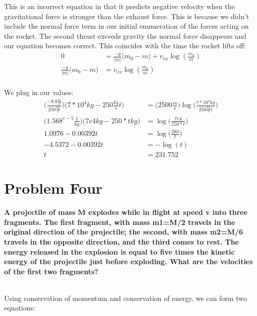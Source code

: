 \documentclass[10pt]{article} %
\begin{document}
This is an incorrect equation in that it predicts negative velocity when the gravitational force is stronger than the exhaust force. This is because we didn't include the normal force term in our initial enumeration of the forces acting on the rocket. The second thrust exceeds gravity the normal force disappears and our equation becomes correct. This coincides with the time the rocket lifts off:\\

\begin{align*}
  0 &= \frac{-g}{|\dot{m}|}\big(m_0-m) + v_{ex}\log(\frac{m_0}{m})\\
  \frac{-g}{|\dot{m}|}\big(m_0-m) &= v_{ex}\log(\frac{m_0}{m})\\
\end{align*}

We plug in our values:\\

\begin{align*}
  \Big(\frac{-9.8\frac{m}{s^2}}{250\frac{kg}{s}}\Big)\big(7*10^4kg - 250\frac{kg}{s}t) &= \big(2500\frac{m}{s}\big)\log\Big(\frac{7*10^{4}kg}{250\frac{kg}{s}t}\Big)\\
  \Big(1.568^{e-5}\frac{1}{kg}\Big)\big(7e4 kg - 250*t kg) &= \log\Big(\frac{7e4}{250*t}\Big)\\
  1.0976 - 0.00392t &= \log\Big(\frac{280}{t}\Big)\\
  -4.5372 - 0.00392t &= -\log(t)\\
  t &= 231.752
\end{align*}

\section{Problem Four}
\textbf{A projectile of mass M explodes while in flight at speed v into three fragments. The first fragment, with mass m1=M/2 travels in the original direction of the projectile; the second, with mass m2=M/6 travels in the opposite direction, and the third comes to rest. The energy released in the explosion is equal to five times the kinetic energy of the projectile just before exploding. What are the velocities of the first two fragments?} \\ \\
\vspace{1 cm}

Using conservation of momentum and conservation of energy, we can form two equations:\\
\end{document}

